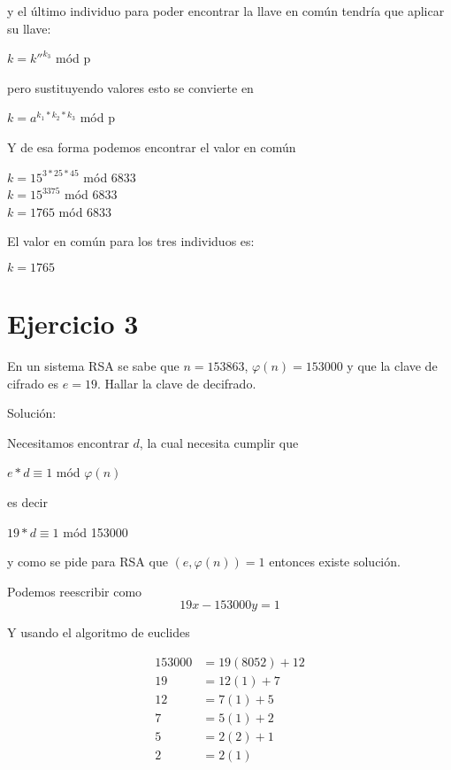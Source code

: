 \documentclass[12pt]{article}
\begin{document}
y el último individuo para poder encontrar la llave en común tendría que aplicar su llave: 


\begin{center}
    $k = k''^{k_{3}}$ mód p 
\end{center}

pero sustituyendo valores esto se convierte en 

\begin{center}
    $k = a^{k_{1}*k_{2}*k_{3}}$ mód p
\end{center}

Y de esa forma podemos encontrar el valor en común

\begin{center}
    $k = 15 ^{3 * 25 * 45}$ mód 6833 \\
    $k = 15 ^{3375}$ mód 6833 \\
    $k = 1765$ mód 6833
\end{center}

El valor en común para los tres individuos es:
\begin{center}
    $k = 1765$
\end{center}



\section{Ejercicio 3}
En un sistema RSA se sabe que $n = 153863$, $\varphi(n) = 153000$ y que la clave de cifrado es $e = 19$. Hallar la clave de decifrado.

\par Solución: 

Necesitamos encontrar $d$, la cual necesita cumplir que 
\begin{center}
    $e*d \equiv 1 $ mód $\varphi(n)$
\end{center}

es decir 

\begin{center}
    $19 * d \equiv 1$ mód 153000
\end{center}

y como se pide para RSA que $(e, \varphi(n)) = 1$ entonces existe solución.

Podemos reescribir como
\begin{equation}
    19x - 153000y = 1
\end{equation}

Y usando el algoritmo de euclides

\begin{equation}
    \begin{split}
        153000 & = 19(8052) + 12 \\
        19 & = 12(1) + 7 \\ 
        12 & = 7(1) + 5 \\
        7 & = 5(1) + 2 \\
        5 & = 2(2) + 1 \\
        2 & = 2(1) 
    \end{split}
\end{equation}
\end{document}
